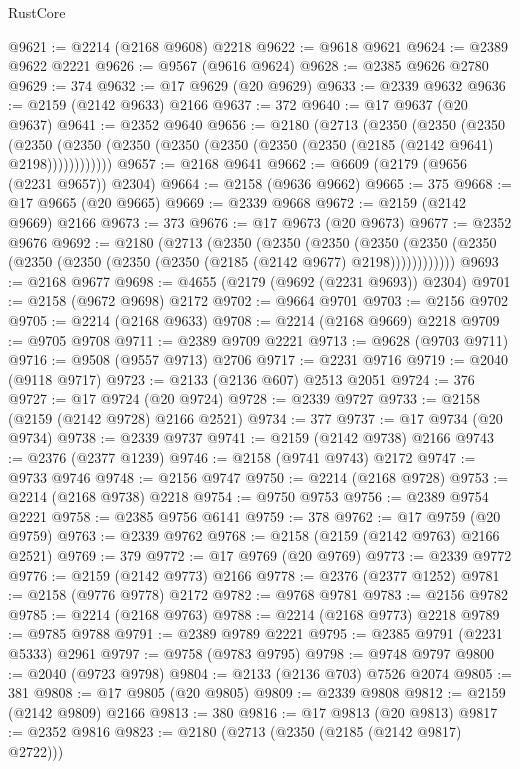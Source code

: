\begin{lexlean}{RustCore}
\begin{coremodule}
@9621 := @2214 (@2168 @9608) @2218
@9622 := @9618 @9621
@9624 := @2389 @9622 @2221
@9626 := @9567 (@9616 @9624)
@9628 := @2385 @9626 @2780
@9629 := 374
@9632 := @17 @9629 (@20 @9629)
@9633 := @2339 @9632
@9636 := @2159 (@2142 @9633) @2166
@9637 := 372
@9640 := @17 @9637 (@20 @9637)
@9641 := @2352 @9640
@9656 := @2180
    (@2713
      (@2350
        (@2350
          (@2350
            (@2350 (@2350 (@2350 (@2350 (@2350 (@2350 (@2350 (@2185 (@2142 @9641) @2198))))))))))))
@9657 := @2168 @9641
@9662 := @6609 (@2179 (@9656 (@2231 @9657)) @2304)
@9664 := @2158 (@9636 @9662)
@9665 := 375
@9668 := @17 @9665 (@20 @9665)
@9669 := @2339 @9668
@9672 := @2159 (@2142 @9669) @2166
@9673 := 373
@9676 := @17 @9673 (@20 @9673)
@9677 := @2352 @9676
@9692 := @2180
    (@2713
      (@2350
        (@2350
          (@2350
            (@2350 (@2350 (@2350 (@2350 (@2350 (@2350 (@2350 (@2185 (@2142 @9677) @2198))))))))))))
@9693 := @2168 @9677
@9698 := @4655 (@2179 (@9692 (@2231 @9693)) @2304)
@9701 := @2158 (@9672 @9698) @2172
@9702 := @9664 @9701
@9703 := @2156 @9702
@9705 := @2214 (@2168 @9633)
@9708 := @2214 (@2168 @9669) @2218
@9709 := @9705 @9708
@9711 := @2389 @9709 @2221
@9713 := @9628 (@9703 @9711)
@9716 := @9508 (@9557 @9713) @2706
@9717 := @2231 @9716
@9719 := @2040 (@9118 @9717)
@9723 := @2133 (@2136 @607) @2513 @2051
@9724 := 376
@9727 := @17 @9724 (@20 @9724)
@9728 := @2339 @9727
@9733 := @2158 (@2159 (@2142 @9728) @2166 @2521)
@9734 := 377
@9737 := @17 @9734 (@20 @9734)
@9738 := @2339 @9737
@9741 := @2159 (@2142 @9738) @2166
@9743 := @2376 (@2377 @1239)
@9746 := @2158 (@9741 @9743) @2172
@9747 := @9733 @9746
@9748 := @2156 @9747
@9750 := @2214 (@2168 @9728)
@9753 := @2214 (@2168 @9738) @2218
@9754 := @9750 @9753
@9756 := @2389 @9754 @2221
@9758 := @2385 @9756 @6141
@9759 := 378
@9762 := @17 @9759 (@20 @9759)
@9763 := @2339 @9762
@9768 := @2158 (@2159 (@2142 @9763) @2166 @2521)
@9769 := 379
@9772 := @17 @9769 (@20 @9769)
@9773 := @2339 @9772
@9776 := @2159 (@2142 @9773) @2166
@9778 := @2376 (@2377 @1252)
@9781 := @2158 (@9776 @9778) @2172
@9782 := @9768 @9781
@9783 := @2156 @9782
@9785 := @2214 (@2168 @9763)
@9788 := @2214 (@2168 @9773) @2218
@9789 := @9785 @9788
@9791 := @2389 @9789 @2221
@9795 := @2385 @9791 (@2231 @5333) @2961
@9797 := @9758 (@9783 @9795)
@9798 := @9748 @9797
@9800 := @2040 (@9723 @9798)
@9804 := @2133 (@2136 @703) @7526 @2074
@9805 := 381
@9808 := @17 @9805 (@20 @9805)
@9809 := @2339 @9808
@9812 := @2159 (@2142 @9809) @2166
@9813 := 380
@9816 := @17 @9813 (@20 @9813)
@9817 := @2352 @9816
@9823 := @2180 (@2713 (@2350 (@2185 (@2142 @9817) @2722)))

\end{coremodule}
\end{lexlean}
